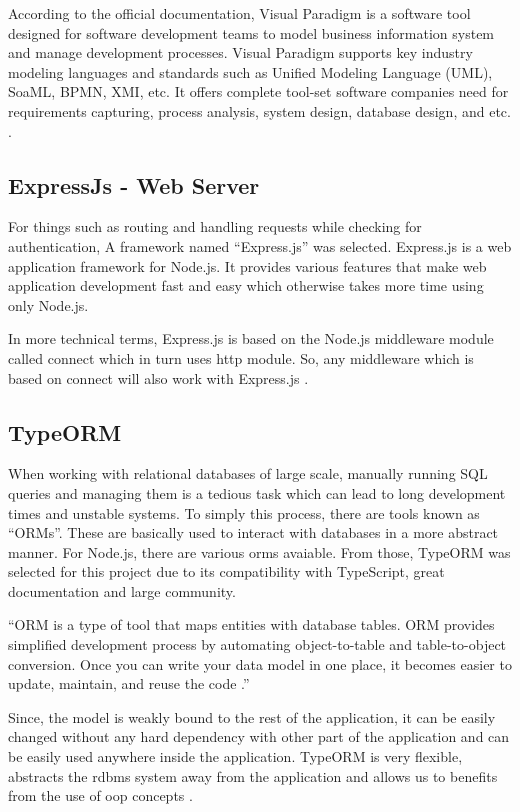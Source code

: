 \documentclass[12pt]{report}
\begin{document}
According to the official documentation, Visual Paradigm is a software tool designed for software development teams to model business information system and manage development processes. Visual Paradigm supports key industry modeling languages and standards such as Unified Modeling Language (UML), SoaML, BPMN, XMI, etc. It offers complete tool-set software companies need for requirements capturing, process analysis, system design, database design, and etc. \cite{paradigm_2020_what}.

\subsection{ExpressJs - Web Server}
For things such as routing and handling requests while checking for authentication, A framework named ``Express.js'' was selected. Express.js is a web application framework for Node.js. It provides various features that make web application development fast and easy which otherwise takes more time using only Node.js.

In more technical terms, Express.js is based on the Node.js middleware module called connect which in turn uses http module. So, any middleware which is based on connect will also work with Express.js \cite{azatmardan_2014_pro}.

\subsection{TypeORM}
When working with relational databases of large scale, manually running SQL queries and managing them is a tedious task which can lead to long development times and unstable systems. To simply this process, there are tools known as ``ORMs''. These are basically used to interact with databases in a more abstract manner. For Node.js, there are various \acrshort{orm}s avaiable. From those, TypeORM was selected for this project due to its compatibility with TypeScript, great documentation and large community.

``ORM is a type of tool that maps entities with database tables. ORM provides simplified development process by automating object-to-table and table-to-object conversion. Once you can write your data model in one place, it becomes easier to update, maintain, and reuse the code \cite{point_2020_typeorm}.''

Since, the model is weakly bound to the rest of the application, it can be easily changed without any hard dependency with other part of the application and can be easily used anywhere inside the application. TypeORM is very flexible, abstracts the \acrshort{rdbms} system away from the application and allows us to benefits from the use of \acrshort{oop} concepts \cite{point_2020_typeorm}.
\end{document}

